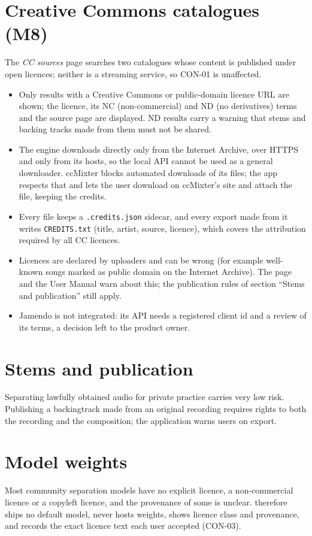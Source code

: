 \documentclass{covermaker}
\begin{document}
\section{Creative Commons catalogues (M8)}
The \emph{CC sources} page searches two catalogues whose content is published
under open licences; neither is a streaming service, so CON-01 is unaffected.
\begin{itemize}
  \item Only results with a Creative Commons or public-domain licence URL are
        shown; the licence, its NC (non-commercial) and ND (no derivatives)
        terms and the source page are displayed. ND results carry a warning
        that stems and backing tracks made from them must not be shared.
  \item The engine downloads directly only from the Internet Archive, over
        HTTPS and only from its hosts, so the local API cannot be used as a
        general downloader. ccMixter blocks automated downloads of its files;
        the app respects that and lets the user download on ccMixter's site
        and attach the file, keeping the credits.
  \item Every file keeps a \texttt{.credits.json} sidecar, and every export
        made from it writes \texttt{CREDITS.txt} (title, artist, source,
        licence), which covers the attribution required by all CC licences.
  \item Licences are declared by uploaders and can be wrong (for example
        well-known songs marked as public domain on the Internet Archive). The
        page and the User Manual warn about this; the publication rules of
        section ``Stems and publication'' still apply.
  \item Jamendo is not integrated: its API needs a registered client id and a
        review of its terms, a decision left to the product owner.
\end{itemize}

\section{Stems and publication}
Separating lawfully obtained audio for private practice carries very low risk.
Publishing a \gls{backingtrack} made from an original recording requires rights to
both the recording and the composition; the application warns users on export.

\section{Model weights}
Most community separation models have no explicit licence, a non-commercial
licence or a copyleft licence, and the provenance of some is unclear. \CM{}
therefore ships no default model, never hosts weights, shows licence class and
provenance, and records the exact licence text each user accepted (CON-03).
\end{document}
